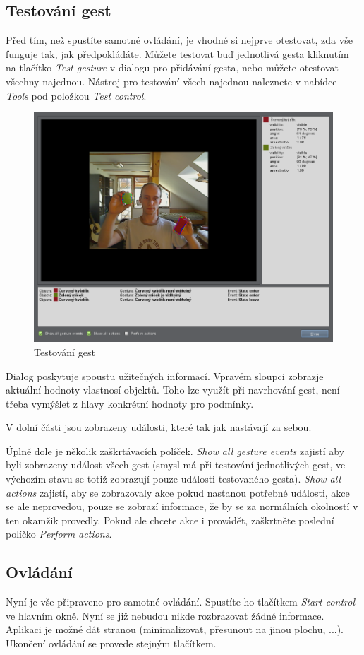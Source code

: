 \subsection{Testování gest}
Před tím, než spustíte samotné ovládání, je vhodné si nejprve otestovat, zda
vše funguje tak, jak předpokládáte. Můžete testovat buď jednotlivá gesta
kliknutím na tlačítko \emph{Test gesture} v dialogu pro přidávání gesta, nebo
můžete otestovat všechny najednou. Nástroj pro testování všech najednou
naleznete v nabídce \emph{Tools} pod položkou \emph{Test control}.

\begin{figure}[H]
\centering
\includegraphics[width=1.1\textwidth]{testgestures.png}
\caption{Testování gest}
\label{fig:testgestures}
\end{figure}

Dialog poskytuje spoustu užitečných informací. Vpravém sloupci zobrazje
aktuální hodnoty vlastnosí objektů. Toho lze využít při navrhování gest, není
třeba vymýšlet z hlavy konkrétní hodnoty pro podmínky.

V dolní části jsou zobrazeny události, které tak jak nastávají za sebou.

Úplně dole je několik zaškrtávacích políček. \emph{Show all gesture events}
zajistí aby byli zobrazeny událost všech gest (smysl má při testování
jednotlivých gest, ve výchozím stavu se totiž zobrazují pouze události
testovaného gesta). \emph{Show all actions} zajistí, aby se zobrazovaly akce
pokud nastanou potřebné události, akce se ale neprovedou, pouze se zobrazí
informace, že by se za normálních okolností v ten okamžik provedly. Pokud ale
chcete akce i provádět, zaškrtněte poslední políčko \emph{Perform actions}.

\subsection{Ovládání}
Nyní je vše připraveno pro samotné ovládání. Spustíte ho tlačítkem \emph{Start
control} ve hlavním okně. Nyní se již nebudou nikde rozbrazovat žádné
informace. Aplikaci je možné dát stranou (minimalizovat, přesunout na jinou
plochu, ...). Ukončení ovládání se provede stejným tlačítkem.
